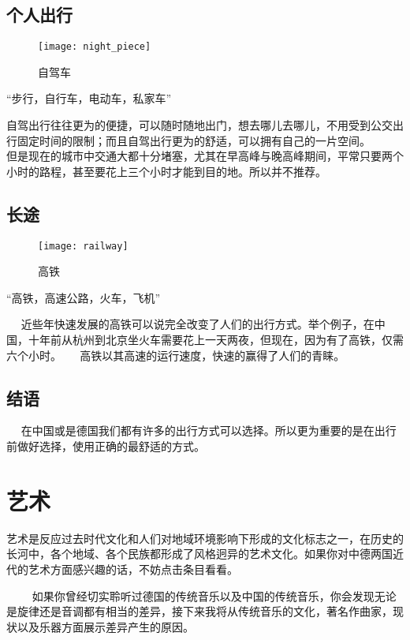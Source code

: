 \subsection{个人出行}

\begin{figure}[htb]
    \centering
    \texttt{[image: night\_piece]}
    \caption{自驾车}
\end{figure}

    “步行，自行车，电动车，私家车” 

    自驾出行往往更为的便捷，可以随时随地出门，想去哪儿去哪儿，不用受到公交出行固定时间的限制；而且自驾出行更为的舒适，可以拥有自己的一片空间。 
    
    但是现在的城市中交通大都十分堵塞，尤其在早高峰与晚高峰期间，平常只要两个小时的路程，甚至要花上三个小时才能到目的地。所以并不推荐。

\subsection{长途}
\begin{figure}[htb]
    \centering
    \texttt{[image: railway]}
    \caption{高铁}
\end{figure}

    “高铁，高速公路，火车，飞机” 

    近些年快速发展的高铁可以说完全改变了人们的出行方式。举个例子，在中国，十年前从杭州到北京坐火车需要花上一天两夜，但现在，因为有了高铁，仅需六个小时。 
    
    高铁以其高速的运行速度，快速的赢得了人们的青睐。

\subsection{结语}
    在中国或是德国我们都有许多的出行方式可以选择。所以更为重要的是在出行前做好选择，使用正确的最舒适的方式。




\section{艺术}
    艺术是反应过去时代文化和人们对地域环境影响下形成的文化标志之一，在历史的长河中，各个地域、各个民族都形成了风格迥异的艺术文化。如果你对中德两国近代的艺术方面感兴趣的话，不妨点击条目看看。

    如果你曾经切实聆听过德国的传统音乐以及中国的传统音乐，你会发现无论是旋律还是音调都有相当的差异，接下来我将从传统音乐的文化，著名作曲家，现状以及乐器方面展示差异产生的原因。

